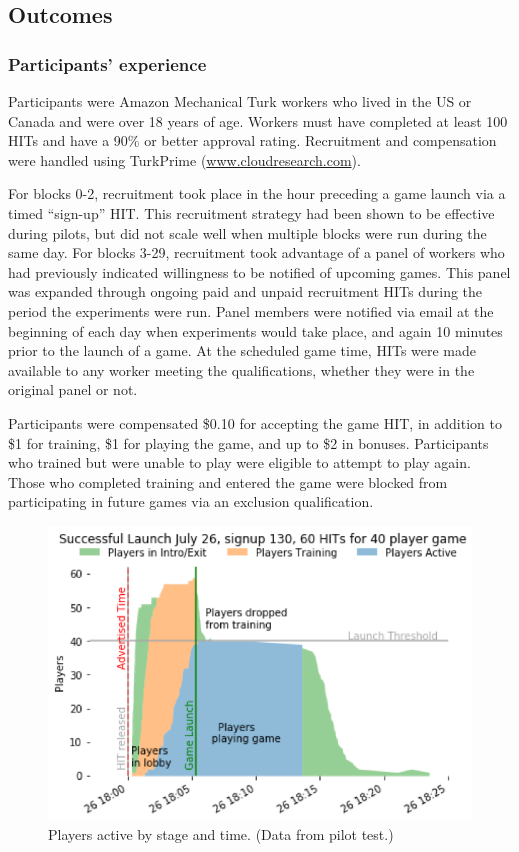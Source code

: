 \documentclass{article}
\begin{document}
\subsection{Outcomes}
\label{outcomes}

\subsubsection{Participants' experience}

Participants were Amazon Mechanical Turk workers who lived in the US or Canada and were over 18 years of age. Workers must have completed at least 100 HITs and have a 90\% or better approval rating. Recruitment and compensation were handled using TurkPrime (\url{www.cloudresearch.com}).

For blocks 0-2, recruitment took place in the hour preceding a game launch via a timed “sign-up” HIT. This recruitment strategy had been shown to be effective during pilots, but did not scale well when multiple blocks were run during the same day. For blocks 3-29, recruitment took advantage of a panel of workers who had previously indicated willingness to be notified of upcoming games. This panel was expanded through ongoing paid and unpaid recruitment HITs during the period the experiments were run. Panel members were notified via email at the beginning of each day when experiments would take place, and again 10 minutes prior to the launch of a game. At the scheduled game time, HITs were made available to any worker meeting the qualifications, whether they were in the original panel or not. 

Participants were compensated \$0.10 for accepting the game HIT, in addition to \$1 for training, \$1 for playing the game, and up to \$2 in bonuses. Participants who trained but were unable to play were eligible to attempt to play again. Those who completed training and entered the game were blocked from participating in future games via an exclusion qualification.

\begin{figure}[H]
\centering
\includegraphics[width=0.6\columnwidth]{recruitment.png}
\caption{Players active by stage and time. (Data from pilot test.)}
\label{fig:recruitment}
\end{figure}
\end{document}
